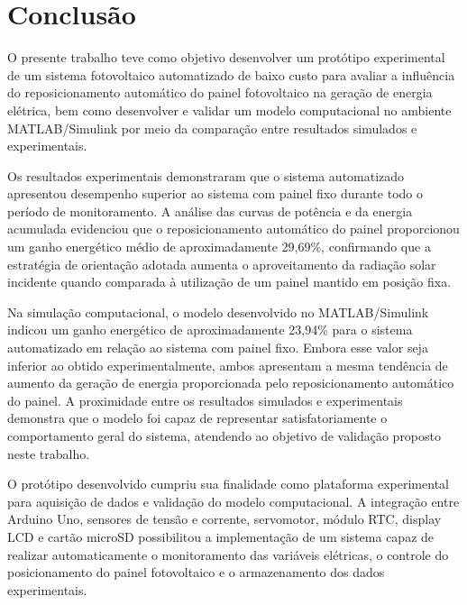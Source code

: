 \chapter{Conclusão} 

\label{cap6_conclusao}

O presente trabalho teve como objetivo desenvolver um protótipo experimental de um sistema fotovoltaico automatizado de baixo custo para avaliar a influência do reposicionamento automático do painel fotovoltaico na geração de energia elétrica, bem como desenvolver e validar um modelo computacional no ambiente MATLAB/Simulink por meio da comparação entre resultados simulados e experimentais.

Os resultados experimentais demonstraram que o sistema automatizado apresentou desempenho superior ao sistema com painel fixo durante todo o período de monitoramento. A análise das curvas de potência e da energia acumulada evidenciou que o reposicionamento automático do painel proporcionou um ganho energético médio de aproximadamente 29,69\%, confirmando que a estratégia de orientação adotada aumenta o aproveitamento da radiação solar incidente quando comparada à utilização de um painel mantido em posição fixa.

Na simulação computacional, o modelo desenvolvido no MATLAB/Simulink indicou um ganho energético de aproximadamente 23,94\% para o sistema automatizado em relação ao sistema com painel fixo. Embora esse valor seja inferior ao obtido experimentalmente, ambos apresentam a mesma tendência de aumento da geração de energia proporcionada pelo reposicionamento automático do painel. A proximidade entre os resultados simulados e experimentais demonstra que o modelo foi capaz de representar satisfatoriamente o comportamento geral do sistema, atendendo ao objetivo de validação proposto neste trabalho.

O protótipo desenvolvido cumpriu sua finalidade como plataforma experimental para aquisição de dados e validação do modelo computacional. A integração entre Arduino Uno, sensores de tensão e corrente, servomotor, módulo RTC, display LCD e cartão microSD possibilitou a implementação de um sistema capaz de realizar automaticamente o monitoramento das variáveis elétricas, o controle do posicionamento do painel fotovoltaico e o armazenamento dos dados experimentais.

